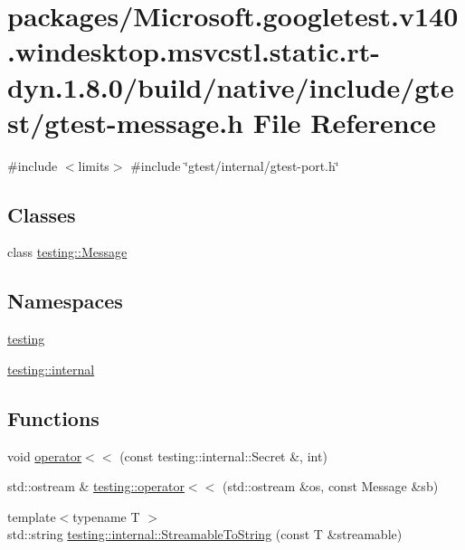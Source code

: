 \hypertarget{gtest-message_8h}{}\section{packages/\+Microsoft.googletest.\+v140.\+windesktop.\+msvcstl.\+static.\+rt-\/dyn.1.8.0/build/native/include/gtest/gtest-\/message.h File Reference}
\label{gtest-message_8h}
{\ttfamily \#include $<$limits$>$}\newline
{\ttfamily \#include \char`\"{}gtest/internal/gtest-\/port.\+h\char`\"{}}\newline
\subsection*{Classes}
\begin{DoxyCompactItemize}
\item 
class \mbox{\hyperlink{classtesting_1_1_message}{testing\+::\+Message}}
\end{DoxyCompactItemize}
\subsection*{Namespaces}
\begin{DoxyCompactItemize}
\item 
 \mbox{\hyperlink{namespacetesting}{testing}}
\item 
 \mbox{\hyperlink{namespacetesting_1_1internal}{testing\+::internal}}
\end{DoxyCompactItemize}
\subsection*{Functions}
\begin{DoxyCompactItemize}
\item 
void \mbox{\hyperlink{gtest-message_8h_ae8f0c86e5c506587b62315e24a918563}{operator$<$$<$}} (const testing\+::internal\+::\+Secret \&, int)
\item 
std\+::ostream \& \mbox{\hyperlink{namespacetesting_a7b802e532fd68749765cb7dc156130db}{testing\+::operator$<$$<$}} (std\+::ostream \&os, const Message \&sb)
\item 
{\footnotesize template$<$typename T $>$ }\\std\+::string \mbox{\hyperlink{namespacetesting_1_1internal_aad4beed95d0846e6ffc5da0978ef3bb9}{testing\+::internal\+::\+Streamable\+To\+String}} (const T \&streamable)
\end{DoxyCompactItemize}


